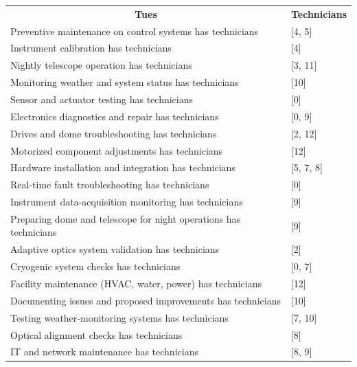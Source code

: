 \documentclass{article}
\begin{document}
\begin{table}[!ht]
\begin{tabular}{ll}
\multicolumn{1}{c}{\textbf{Tues}}                                 & \multicolumn{1}{c}{\textbf{Technicians}} \\
Preventive maintenance on control systems has technicians         & {[}4, 5{]}                               \\
Instrument calibration has technicians                            & {[}4{]}                                  \\
Nightly telescope operation has technicians                       & {[}3, 11{]}                              \\
Monitoring weather and system status has technicians              & {[}10{]}                                 \\
Sensor and actuator testing has technicians                       & {[}0{]}                                  \\
Electronics diagnostics and repair has technicians                & {[}0, 9{]}                               \\
Drives and dome troubleshooting has technicians                   & {[}2, 12{]}                              \\
Motorized component adjustments has technicians                   & {[}12{]}                                 \\
Hardware installation and integration has technicians             & {[}5, 7, 8{]}                            \\
Real-time fault troubleshooting has technicians                   & {[}0{]}                                  \\
Instrument data-acquisition monitoring has technicians            & {[}9{]}                                  \\
Preparing dome and telescope for night operations has technicians & {[}9{]}                                  \\
Adaptive optics system validation has technicians                 & {[}2{]}                                  \\
Cryogenic system checks has technicians                           & {[}0, 7{]}                               \\
Facility maintenance (HVAC, water, power) has technicians         & {[}12{]}                                 \\
Documenting issues and proposed improvements has technicians      & {[}10{]}                                 \\
Testing weather‑monitoring systems has technicians                & {[}7, 10{]}                              \\
Optical alignment checks has technicians                          & {[}8{]}                                  \\
IT and network maintenance has technicians                        & {[}8, 9{]}                               \\                                      
\end{tabular}
\end{table}
\end{document}
